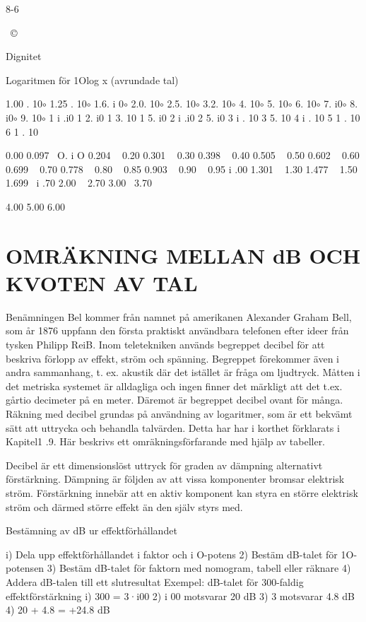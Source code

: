 \documentclass[a4paper,twoside,twocolumn,openright]{book}
\begin{document}
{{{{{{{{{{{{{8-6

~©

Dignitet

Logaritmen
för 1Olog x
(avrundade
tal)

1.00 . 10$\circ$
1.25 . 10$\circ$
1.6. i 0$\circ$
2.0. 10$\circ$
2.5. 10$\circ$
3.2. 10$\circ$
4. 10$\circ$
5. 10$\circ$
6. 10$\circ$
7. i0$\circ$
8. i0$\circ$
9. 10$\circ$
1
i .i0
1
2. i0
1
3. 10
1
5. i0
2
i .i0
2
5. i0
3
i . 10
3
5. 10
4
i . 10
5
1 . 10
6
1 . 10

0.00
0.097 ~O. i O
0.204 ~ 0.20
0.301 ~ 0.30
0.398 ~ 0.40
0.505 ~ 0.50
0.602 ~ 0.60
0.699 ~ 0.70
0.778 ~ 0.80
~ 0.85
0.903 ~ 0.90
~ 0.95
i .00
1.301 ~ 1.30
1.477 ~ 1.50
1.699 ~i .70
2.00
~ 2.70
3.00
~3.70

4.00
5.00
6.00

\chapter{OMRÄKNING MELLAN dB OCH KVOTEN AV TAL}

Benämningen Bel kommer från namnet på
amerikanen Alexander Graham Bell, som år
1876 uppfann den första praktiskt användbara telefonen efter ideer från tysken Philipp
ReiB.
Inom teletekniken används begreppet
decibel för att beskriva förlopp av effekt,
ström och spänning. Begreppet förekommer
även i andra sammanhang, t. ex. akustik där
det istället är fråga om ljudtryck.
Måtten i det metriska systemet är alldagliga och ingen finner det märkligt att det
t.ex. gårtio decimeter på en meter. Däremot
är begreppet decibel ovant för många.
Räkning med decibel grundas på användning av logaritmer, som är ett bekvämt
sätt att uttrycka och behandla talvärden.
Detta har har i korthet förklarats i Kapitel1 .9.
Här beskrivs ett omräkningsförfarande med
hjälp av tabeller.

Decibel är ett dimensionslöst uttryck för
graden av dämpning alternativt förstärkning.
Dämpning är följden av att vissa komponenter bromsar elektrisk ström.
Förstärkning innebär att en aktiv komponent kan styra en större elektrisk ström och
därmed större effekt än den själv styrs med.

Bestämning av dB ur effektförhållandet

i) Dela upp effektförhållandet i faktor och
i O-potens
2) Bestäm dB-talet för 1O-potensen
3) Bestäm dB-talet för faktorn med nomogram, tabell eller räknare
4) Addera dB-talen till ett slutresultat
Exempel: dB-talet för 300-faldig effektförstärkning
i) 300 = 3·i00
2) i 00 motsvarar 20 dB
3) 3 motsvarar 4.8 dB
4) 20 + 4.8 = +24.8 dB

}}}}}}}}}}}}}
\end{document}
